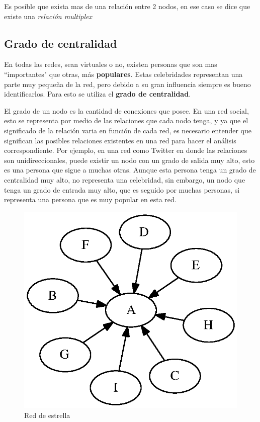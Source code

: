 Es posible que exista mas de una relación entre 2 nodos, en ese caso se dice que existe una \textit{relación multiplex}

\subsection{Grado de centralidad}

En todas las redes, sean virtuales o no, existen personas que son mas ``importantes" que otras, más \textbf{populares}. Estas celebridades representan una parte muy pequeña de la red, pero debido a su gran influencia siempre es bueno identificarlos. Para esto se utiliza el \textbf{grado de centralidad}.

El grado de un nodo es la cantidad de conexiones que posee. En una red social, esto se representa por medio de las relaciones que cada nodo tenga, y ya que el significado de la relación varia en función de cada red, es necesario entender que significan las posibles relaciones existentes en una red para hacer el análisis correspondiente. Por ejemplo, en una red como Twitter en donde las relaciones son unidireccionales, puede existir un nodo con un grado de salida muy alto, esto es una persona que sigue a muchas otras. Aunque esta persona tenga un grado de centralidad muy alto, no representa una celebridad, sin embargo, un nodo que tenga un grado de entrada muy alto, que es seguido por muchas personas, si representa una persona que es muy popular en esta red.

\begin{figure}[!htb]
  \begin{center}
    \includegraphics{./imagenes/red_estrella.eps}
    \caption{Red de estrella}
    \label{fig:red_estrella}
  \end{center}
\end{figure}

